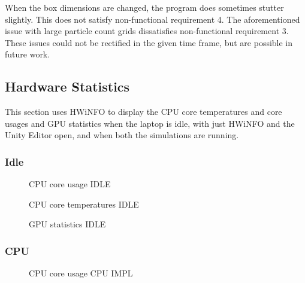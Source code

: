 \documentclass[12pt]{article}
\newcommand{\wideimage}[2][]{%
  \makebox[\textwidth][c]{\texttt{[image: \#2]}}%
}
\begin{document}
    When the box dimensions are changed, the program does sometimes stutter slightly. This does not satisfy non-functional requirement 4. The aforementioned issue with large particle count grids dissatisfies non-functional requirement 3. These issues could not be rectified in the given time frame, but are possible in future work.

    \subsection{Hardware Statistics}

    This section uses HWiNFO\cite{hwinfo} to display the CPU core temperatures and core usages and GPU statistics when the laptop is idle, with just HWiNFO and the Unity Editor open, and when both the simulations are running.

    \subsubsection{Idle}

    \begin{figure}[H]
        \begin{center}
            \wideimage[width=1.1\textwidth]{beforeCPUUsage.png}
            \caption{CPU core usage IDLE}
        \end{center}
    \end{figure}

    \begin{figure}[H]
        \begin{center}
            \wideimage[width=0.75\textwidth, height=0.41\textheight]{beforeCPUTemp.png}
            \caption{CPU core temperatures IDLE}
        \end{center}
    \end{figure}

    \begin{figure}[H]
        \begin{center}
            \wideimage[width=0.75\textwidth, height=0.41\textheight]{beforeGPU.png}
            \caption{GPU statistics IDLE}
        \end{center}
    \end{figure}

    \subsubsection{CPU}

    \begin{figure}[H]
        \begin{center}
            \wideimage[width=1.1\textwidth]{afterCPUUsageCPU.png}
            \caption{CPU core usage CPU IMPL}
        \end{center}
    \end{figure}
\end{document}
